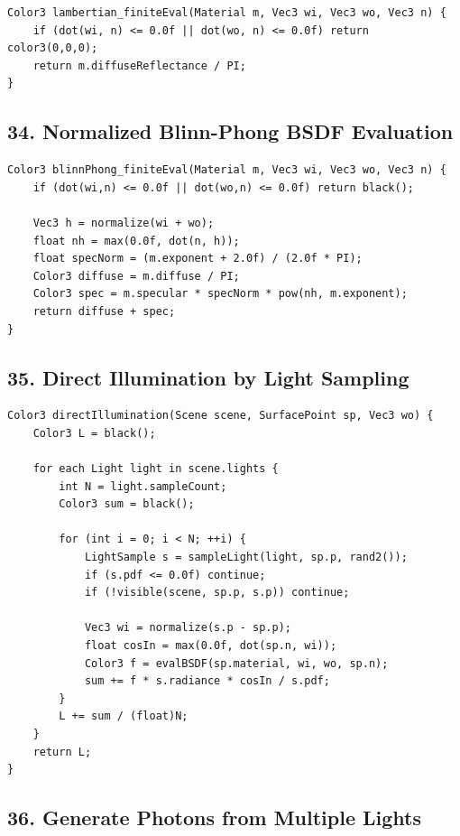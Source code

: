 \documentclass[10pt,letterpaper]{article}
\begin{document}
\begin{verbatim}
Color3 lambertian_finiteEval(Material m, Vec3 wi, Vec3 wo, Vec3 n) {
    if (dot(wi, n) <= 0.0f || dot(wo, n) <= 0.0f) return color3(0,0,0);
    return m.diffuseReflectance / PI;
}
\end{verbatim}

\subsection{34. Normalized Blinn-Phong BSDF Evaluation}

\begin{verbatim}
Color3 blinnPhong_finiteEval(Material m, Vec3 wi, Vec3 wo, Vec3 n) {
    if (dot(wi,n) <= 0.0f || dot(wo,n) <= 0.0f) return black();

    Vec3 h = normalize(wi + wo);
    float nh = max(0.0f, dot(n, h));
    float specNorm = (m.exponent + 2.0f) / (2.0f * PI);
    Color3 diffuse = m.diffuse / PI;
    Color3 spec = m.specular * specNorm * pow(nh, m.exponent);
    return diffuse + spec;
}
\end{verbatim}

\subsection{35. Direct Illumination by Light Sampling}

\begin{verbatim}
Color3 directIllumination(Scene scene, SurfacePoint sp, Vec3 wo) {
    Color3 L = black();

    for each Light light in scene.lights {
        int N = light.sampleCount;
        Color3 sum = black();

        for (int i = 0; i < N; ++i) {
            LightSample s = sampleLight(light, sp.p, rand2());
            if (s.pdf <= 0.0f) continue;
            if (!visible(scene, sp.p, s.p)) continue;

            Vec3 wi = normalize(s.p - sp.p);
            float cosIn = max(0.0f, dot(sp.n, wi));
            Color3 f = evalBSDF(sp.material, wi, wo, sp.n);
            sum += f * s.radiance * cosIn / s.pdf;
        }
        L += sum / (float)N;
    }
    return L;
}
\end{verbatim}

\subsection{36. Generate Photons from Multiple Lights}
\end{document}
